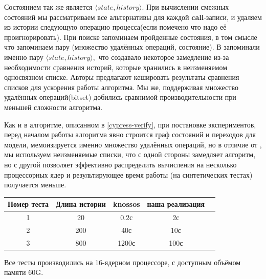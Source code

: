 \documentclass[pdftex,ptm,14pt,a4paper]{extreport}
\theoremstyle{definition}
\begin{document}
Состоянием так же является $\langle state, history \rangle.$
При вычислении смежных состояний мы рассматриваем все альтернативы для каждой \textbf{call}-записи, и удаляем
из истории следующую операцию процесса(если помечено что надо её проигнорировать).
При поиске запоминаем пройденные состояния, в том смысле что запоминаем пару (множество удалённых операций, состояние).
В \cite{horn-faster} запоминали именно пару $\langle state, history \rangle,$ что создавало некоторое замедление из-за
необходимости сравнения историй, которые хранились в неизменяемом односвязном списке. Авторы предлагают кешировать результаты
сравнения списков для ускорения работы алгоритма. Мы же, поддерживая множество удалённых операций(bitset) добились сравнимой
производительности при меньшей сложности алгоритма.

Как и в алгоритме, описанном в \ref{cypress-verify}, при постановке экспериментов,
перед началом работы алгоритма явно строится граф состояний и переходов для модели,
мемоизируется именно множество удалённых операций, но в отличие от \cite{knossos}, мы
используем неизменяемые списки, что с одной стороны замедляет алгоритм, но с другой позволяет
эффективно распределить вычисления на несколько процессорных ядер и результирующее время работы
(на синтетических тестах) получается меньше.

\begin{center}
  \begin{tabular}{| c | c | c | c | c| }
      \hline
        Номер теста & Длина истории & knossos & наша реализация \\
        \hline
        1           & 20            & 0.2с     & 2с             \\
        \hline
        2           & 200           & 40с      & 10с              \\
        \hline
        3           & 800           & 1200с    & 100с              \\
        \hline
  \end{tabular}
\end{center}
Все тесты производились на 16-ядерном процессоре, с доступным объёмом памяти 60G.
\end{document}
